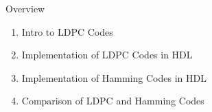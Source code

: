 \documentclass{beamer}
\begin{document}
% 

\begin{frame}{Overview}
    \begin{enumerate}
        \item Intro to LDPC Codes
        \item Implementation of LDPC Codes in HDL
        \item Implementation of Hamming Codes in HDL
        \item Comparison of LDPC and Hamming Codes
    \end{enumerate}
\end{frame}
\end{document}
